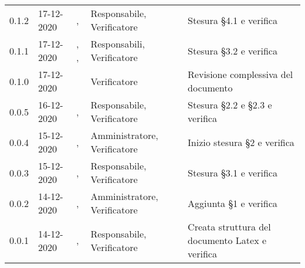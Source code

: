 {{\begin{longtable}{C{1.7cm} C{2.5cm} C{3.2cm} C{2.7cm} C{4.8cm}}
0.1.2 & 17-12-2020 & \SG{}, \ZM{} & Responsabile, Verificatore & Stesura \S 4.1 e verifica\\

0.1.1 & 17-12-2020 & \SG{}, \BM{}, \SH{} & Responsabili, Verificatore & Stesura \S 3.2 e verifica \\

0.1.0 & 17-12-2020 & \ZM{} & Verificatore & Revisione complessiva del documento \\

0.0.5 & 16-12-2020 & \BM{}, \SH{} & Responsabile, Verificatore & Stesura \S 2.2 e \S 2.3 e verifica \\
		
0.0.4 & 15-12-2020 & \PA{}, \SH{} & Amministratore, Verificatore & Inizio stesura \S 2 e verifica \\

0.0.3 & 15-12-2020 & \SG{}, \ZM{} & Responsabile, Verificatore & Stesura \S 3.1 e verifica \\

0.0.2 & 14-12-2020 & \PA{}, \ZM{} & Amministratore, Verificatore & Aggiunta \S 1 e verifica \\

0.0.1 & 14-12-2020 & \SG{}, \ZM{} & Responsabile, Verificatore & Creata struttura del documento Latex e verifica \\
		
\end{longtable}
}
}
